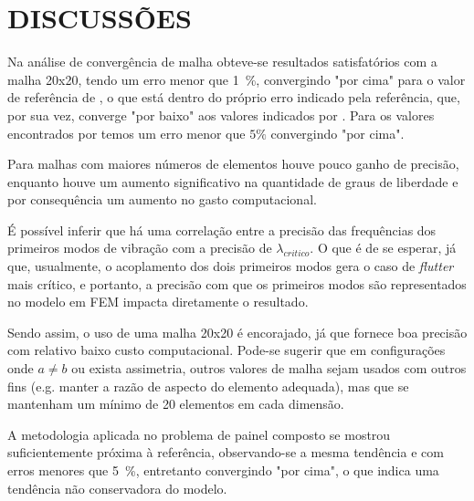 \section{DISCUSSÕES}

Na análise de convergência de malha obteve-se resultados 
satisfatórios com a malha 20x20, tendo um erro menor que 
\SI{1}{\percent}, convergindo "por cima" para o valor de referência 
de \cite{pegado_metodo_2003}, o que está dentro do próprio erro 
indicado pela referência, que, por sua vez, converge "por baixo" aos
valores indicados por \cite{dowell_aeroelasticity_1974}. Para os valores 
encontrados por \citet[Table 2]{hedgepeth_flutter_1957} temos um 
erro menor que $5\%$ convergindo "por cima".

Para malhas com maiores números de elementos houve pouco ganho de precisão, enquanto houve um aumento significativo na quantidade de graus de liberdade e por consequência um aumento no gasto computacional.

É possível inferir que há uma correlação entre a precisão das frequências dos primeiros modos de vibração com a precisão de $\lambda_{critico}$.
O que é de se esperar, já que, usualmente, o acoplamento dos dois primeiros modos gera o caso de \emph{flutter} mais crítico, e portanto, a precisão com que os primeiros modos são representados no modelo em FEM impacta diretamente o resultado.

Sendo assim, o uso de uma malha 20x20 é encorajado, já que fornece boa precisão com relativo baixo custo computacional. Pode-se sugerir que em configurações onde $a \neq b$ ou exista assimetria, outros valores de malha sejam usados com outros fins (e.g. manter a razão de aspecto do elemento adequada), mas que se mantenham um mínimo de 20 elementos em cada dimensão.

A metodologia aplicada no problema de painel composto se mostrou suficientemente próxima à referência, observando-se a mesma tendência e com erros menores que \SI{5}{\percent}, entretanto convergindo "por cima", o que indica uma tendência não conservadora do modelo.

